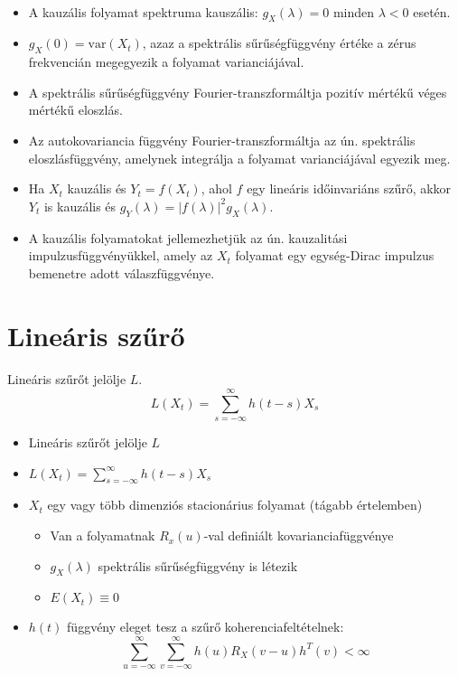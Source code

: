 \documentclass[11pt,a4paper]{article}
\begin{document}
					\paragraph{}
					\begin{itemize}
						\item A kauzális folyamat spektruma kauszális: $g_X(\lambda) = 0$ minden $\lambda < 0$ esetén.
						\item $g_X(0) = \text{var}(X_t)$, azaz a spektrális sűrűségfüggvény értéke a zérus frekvencián megegyezik a folyamat varianciájával.
						\item A spektrális sűrűségfüggvény Fourier-transzformáltja pozitív mértékű véges mértékű eloszlás.
						\item Az autokovariancia függvény Fourier-transzformáltja az ún. spektrális eloszlásfüggvény, amelynek integrálja a folyamat varianciájával egyezik meg.
						\item Ha $X_t$ kauzális és $Y_t = f(X_t)$, ahol $f$ egy lineáris időinvariáns szűrő, akkor $Y_t$ is kauzális és $g_Y(\lambda) = |f(\lambda)|^2 g_X(\lambda)$.
						\item A kauzális folyamatokat jellemezhetjük az ún. kauzalitási impulzusfüggvényükkel, amely az $X_t$ folyamat egy egység-Dirac impulzus bemenetre adott válaszfüggvénye.
					\end{itemize}
			\section{Lineáris szűrő}
				\paragraph{}
					Lineáris szűrőt jelölje $L$.
					$$L(X_t) = \sum_{s = -\infty}^\infty h(t-s)X_s$$
					
					\begin{itemize}
					  \item Lineáris szűrőt jelölje $L$
					  \item $L(X_t) = \sum_{s = -\infty}^\infty h(t-s)X_s$
					  \item $X_t$ egy vagy több dimenziós stacionárius folyamat (tágabb értelemben)
					  \begin{itemize}
						    \item Van a folyamatnak $R_x(u)$-val definiált kovarianciafüggvénye
						    \item $g_X(\lambda)$ spektrális sűrűségfüggvény is létezik
						    \item $E(X_t) \equiv 0$
					  \end{itemize}
					  \item $h(t)$ függvény eleget tesz a szűrő koherenciafeltételnek: 
					  $$\sum_{u = -\infty} ^\infty \sum_{v = -\infty}^\infty h(u) R_X(v-u) h^T(v) < \infty$$
					\end{itemize}
\end{document}
